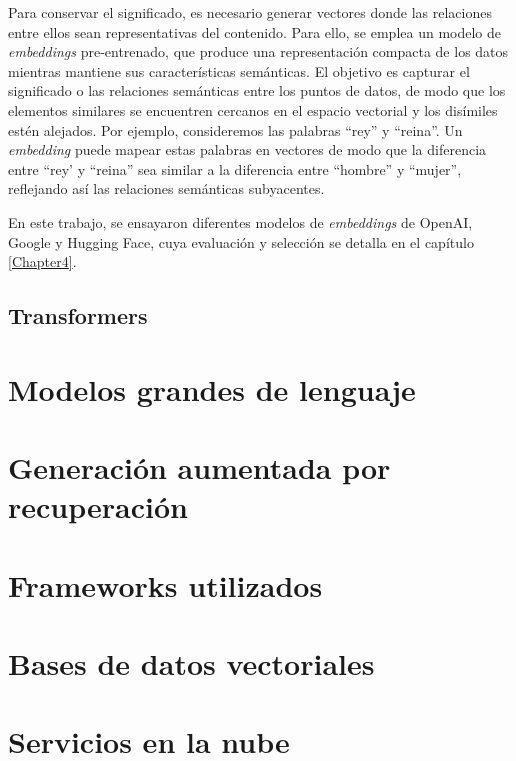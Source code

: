 Para conservar el significado, es necesario generar vectores donde las relaciones entre ellos sean representativas 
del contenido. Para ello, se emplea un modelo de \textit{embeddings} pre-entrenado, que produce una representación compacta 
de los datos mientras mantiene sus características semánticas. El objetivo es capturar el significado o las relaciones 
semánticas entre los puntos de datos, de modo que los elementos similares se encuentren cercanos en el espacio vectorial y los disímiles estén alejados. 
Por ejemplo, consideremos las palabras ``rey'' y ``reina''. Un \textit{embedding} puede mapear estas palabras en vectores de modo 
que la diferencia entre ``rey' y ``reina'' sea similar a la diferencia entre ``hombre'' y ``mujer'', reflejando así las 
relaciones semánticas subyacentes.

En este trabajo, se ensayaron diferentes modelos de \textit{embeddings} de OpenAI, Google y Hugging Face, 
cuya evaluación y selección se detalla en el capítulo \ref{Chapter4}.

\subsection{Transformers}

\section{Modelos grandes de lenguaje}

\section{Generación aumentada por recuperación}

\section{Frameworks utilizados}

\section{Bases de datos vectoriales}

\section{Servicios en la nube}